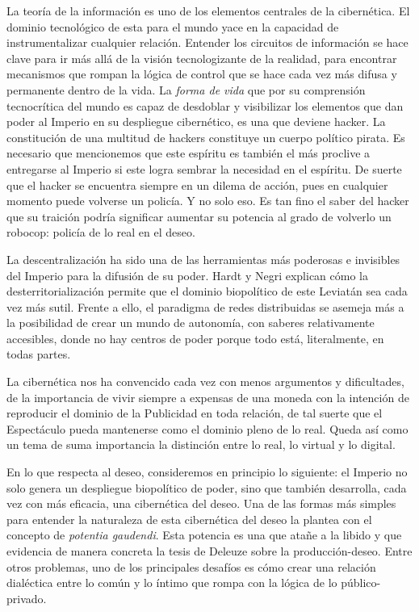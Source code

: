 La teoría de la información es uno de los elementos centrales de la cibernética. El dominio tecnológico de esta para el mundo yace en la capacidad de instrumentalizar cualquier relación. Entender los circuitos de información se hace clave para ir más allá de la visión tecnologizante de la realidad, para encontrar mecanismos que rompan la lógica de control que se hace cada vez más difusa y permanente dentro de la vida. La \emph{forma de vida} que por su comprensión tecnocrítica del mundo es capaz de desdoblar y visibilizar los elementos que dan poder al Imperio en su despliegue cibernético, es una que deviene hacker. La constitución de una multitud de hackers constituye un cuerpo político pirata. Es necesario que mencionemos que este espíritu es también el más proclive a entregarse al Imperio si este logra sembrar la necesidad en el espíritu. De suerte que el hacker se encuentra siempre en un dilema de acción, pues en cualquier momento puede volverse un policía. Y no solo eso. Es tan fino el saber del hacker que su traición podría significar aumentar su potencia al grado de volverlo un robocop: policía de lo real en el deseo.

La descentralización ha sido una de las herramientas más poderosas e invisibles del Imperio para la difusión de su poder. Hardt y Negri explican cómo la desterritorialización permite que el dominio biopolítico de este Leviatán sea cada vez más sutil. Frente a ello, el paradigma de redes distribuidas se asemeja más a la posibilidad de crear un mundo de autonomía, con saberes relativamente accesibles, donde no hay centros de poder porque todo está, literalmente, en todas partes.

La cibernética nos ha convencido cada vez con menos argumentos y dificultades, de la importancia de vivir siempre a expensas de una moneda con la intención de reproducir el dominio de la Publicidad en toda relación, de tal suerte que el Espectáculo pueda mantenerse como el dominio pleno de lo real. Queda así como un tema de suma importancia la distinción entre lo real, lo virtual y lo digital.

En lo que respecta al deseo, consideremos en principio lo siguiente: el Imperio no solo genera un despliegue biopolítico de poder, sino que también desarrolla, cada vez con más eficacia, una cibernética del deseo. Una de las formas más simples para entender la naturaleza de esta cibernética del deseo la plantea \autocite{preciadoTestoYonqui2008} con el concepto de \emph{potentia gaudendi}. Esta potencia es una que atañe a la libido y que evidencia de manera concreta la tesis de Deleuze sobre la producción-deseo. Entre otros problemas, uno de los principales desafíos es cómo crear una relación dialéctica entre lo común y lo íntimo que rompa con la lógica de lo público-privado.

